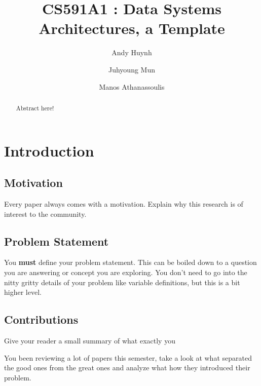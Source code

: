 \documentclass[sigconf]{acmart}
\begin{document}
\title{CS591A1 : Data Systems Architectures, a Template}

\author{Andy Huynh}
\author{Juhyoung Mun}
\author{Manos Athanassoulis}

\begin{abstract}
    Abstract here! 
\end{abstract}

\maketitle

\section{Introduction}

\subsection{Motivation}

Every paper always comes with a motivation. Explain why this research is of interest
to the community.

\subsection{Problem Statement}

You \textbf{must} define your problem statement. This can be boiled down to a 
question you are answering or concept you are exploring. You don't need to go into
the nitty gritty details of your problem like variable definitions, but this is a
bit higher level.

\subsection{Contributions}

Give your reader a small summary of what exactly you 

You been reviewing a lot of papers this semester, take a look at what separated
the good ones from the great ones and analyze what how they introduced their
problem.


\end{document}
